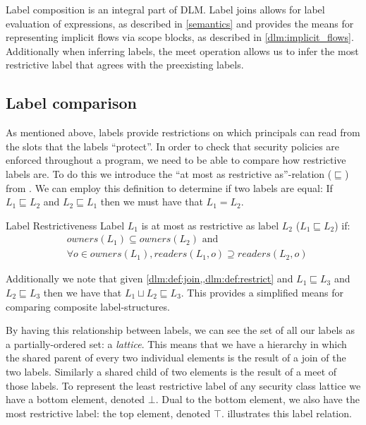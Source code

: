 Label composition is an integral part of DLM.
Label joins allows for label evaluation of expressions, as described in \cref{semantics} and provides the means for representing implicit flows via scope blocks, as described in \cref{dlm:implicit_flows}.
Additionally when inferring labels, the meet operation allows us to infer the most restrictive label that agrees with the preexisting labels.

\subsection{Label comparison}
As mentioned above, labels provide restrictions on which principals can read from the slots that the labels ``protect''.
In order to check that security policies are enforced throughout a program, we need to be able to compare how restrictive labels are.
To do this we introduce the ``at most as restrictive as''-relation ($\sqsubseteq$) from \cite{myers1997}.
We can employ this definition to determine if two labels are equal:
If $L_1 \sqsubseteq L_2$ and $L_2 \sqsubseteq L_1$ then we must have that $L_1 = L_2$.

\begin{definition}{Label Restrictiveness}\label{dlm:def:restrict}
  Label $L_1$ is at most as restrictive as label $L_2$ ($L_1 \sqsubseteq L_2$) if:
  \begin{align*}
    & owners(L_1) \subseteq owners(L_2) \text{ and} \\
    & \forall o \in owners(L_1) , readers(L_1, o) \supseteq readers(L_2, o)
  \end{align*}
\end{definition}

Additionally we note that given \cref{dlm:def:join,,dlm:def:restrict} and $L_1 \sqsubseteq L_3$ and $L_2 \sqsubseteq L_3$ then we have that $L_1 \sqcup L_2 \sqsubseteq L_3$.
This provides a simplified means for comparing composite label-structures.

By having this relationship between labels, we can see the set of all our labels as a partially-ordered set: a \emph{lattice}.
This means that we have a hierarchy in which the shared parent of every two individual elements is the result of a join of the two labels.
Similarly a shared child of two elements is the result of a meet of those labels.
To represent the least restrictive label of any security class lattice we have a bottom element, denoted $\bot$.
Dual to the bottom element, we also have the most restrictive label: the top element, denoted $\top$.
 illustrates this label relation.

